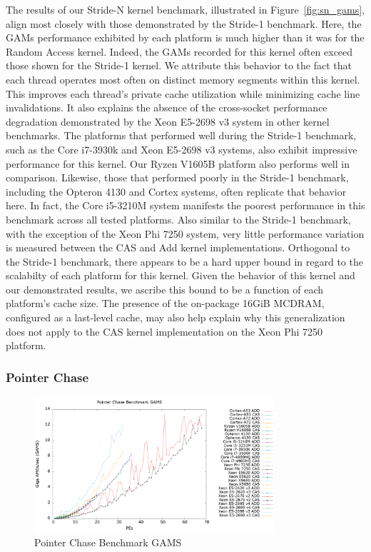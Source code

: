 The results of our Stride-N kernel benchmark, illustrated in Figure~\ref{fig:sn_gams}, align most closely with those demonstrated by the Stride-1 benchmark.
Here, the GAMs performance exhibited by each platform is much higher than it was for the Random Access kernel.
Indeed, the GAMs recorded for this kernel often exceed those shown for the Stride-1 kernel.
We attribute this behavior to the fact that each thread operates most often on distinct memory segments within this kernel.
This improves each thread's private cache utilization while minimizing cache line invalidations.
It also explains the absence of the cross-socket performance degradation demonstrated by the Xeon E5-2698 v3 system in other kernel benchmarks.
The platforms that performed well during the Stride-1 benchmark, such as the Core i7-3930k and Xeon E5-2698 v3 systems, also exhibit impressive performance for this kernel.
Our Ryzen V1605B platform also performs well in comparison.
Likewise, those that performed poorly in the Stride-1 benchmark, including the Opteron 4130 and Cortex systems, often replicate that behavior here.
In fact, the Core i5-3210M system manifests the poorest performance in this benchmark across all tested platforms.
Also similar to the Stride-1 benchmark, with the exception of the Xeon Phi 7250 system, very little performance variation is measured between the CAS and Add kernel implementations.
Orthogonal to the Stride-1 benchmark, there appears to be a hard upper bound in regard to the scalabilty of each platform for this kernel.
Given the behavior of this kernel and our demonstrated results, we ascribe this bound to be a function of each platform's cache size.
The presence of the on-package 16GiB MCDRAM, configured as a last-level cache, may also help explain why this generalization does not apply to the CAS kernel implementation on the Xeon Phi 7250 platform.

\subsubsection{Pointer Chase}
\label{subsubsec:ptrchase_res}

\begin{figure}[!t]
\centering
\includegraphics[width=3.5in]{figures/PTRCHASE_GAMS.png}
\caption{Pointer Chase Benchmark GAMS}
\label{fig:ptrchase_gams}
\end{figure}

